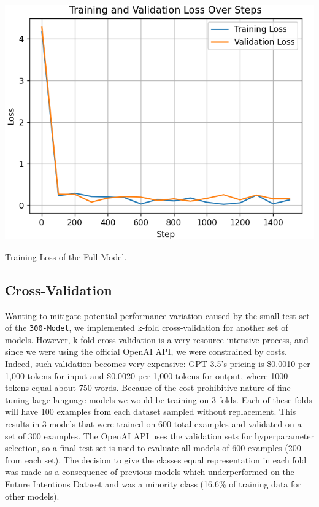 \documentclass[10pt,twocolumn,letterpaper]{article}
\begin{document}
\begin{center}
    \includegraphics*[scale=0.55]{img/training_loss_full.png} 
\end{center}

\begin{center}
    \small {Training Loss of the Full-Model.} 
\end{center}

\subsection{Cross-Validation}

Wanting to mitigate potential performance variation caused by the small test set of the \texttt{300-Model}, 
we implemented k-fold cross-validation for another set of models.
However, k-fold cross validation is a very resource-intensive process, and since we were using the official OpenAI API,
we were constrained by costs. Indeed, such validation becomes very expensive: GPT-3.5's pricing is \$0.0010 per 1,000 tokens 
for input and \$0.0020 per 1,000 tokens for output, where 1000 tokens equal about 750 words.
Because of the cost prohibitive nature of fine tuning large language models we would be training on 3 folds. 
Each of these folds will have 100 examples from each dataset sampled without replacement. 
This results in 3 models that were trained on 600 total examples and validated on a set of 300 examples. 
The OpenAI API uses the validation sets for hyperparameter selection, so a final test set is used to evaluate all models 
of 600 examples (200 from each set). The decision to give the classes equal representation in each fold was made as 
a consequence of previous models which underperformed on the Future Intentions Dataset and was
a minority class (16.6\% of training data for other models).
\end{document}
